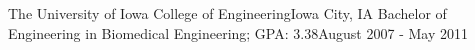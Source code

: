 \resumePosition
    {The University of Iowa College of Engineering}{Iowa City, IA}
    {Bachelor of Engineering in Biomedical Engineering;  GPA: 3.38}{August 2007 - May 2011}